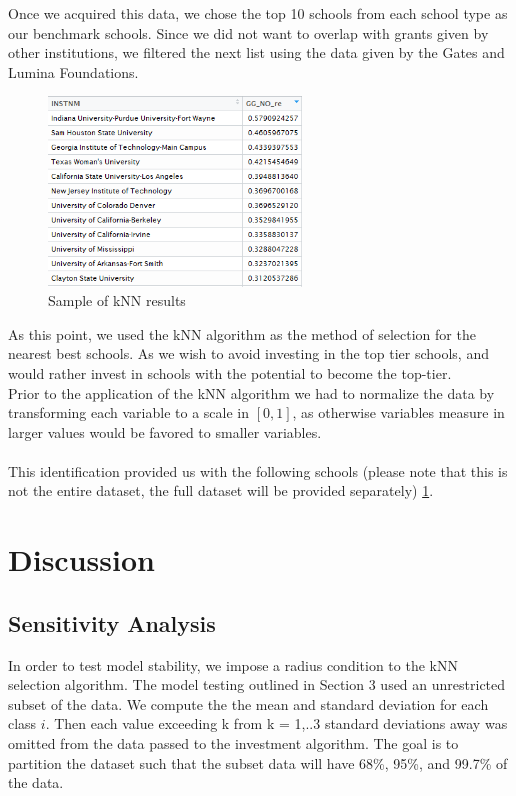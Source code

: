 \documentclass[12pt]{scrartcl}
\begin{document}
	Once we acquired this data, we chose the top 10 schools from each school type as our benchmark schools. Since we did not want to overlap with grants given by other institutions, we filtered the next list using the data given by the Gates\cite{Bill} and Lumina \cite{Grant} Foundations.\\
	\begin{figure}[H]
		\centering
		\includegraphics[width=0.6\textwidth]{6yr-col.png}
		\caption{Sample of kNN results}
		\label{fig:kNN}
	\end{figure}
	
	As this point, we used the kNN algorithm as the method of selection for the nearest best schools. As we wish to avoid investing in the top tier schools, and would rather invest in schools with the potential to become the top-tier.\\ 
	Prior to the application of the kNN algorithm we had to normalize the data by transforming each variable to a scale in $[0,1]$, as otherwise variables measure in larger values would be favored to smaller variables.\\
	\\
	This identification provided us with the following schools (please note that this is not the entire dataset, the full dataset will be provided separately) \ref{fig:kNN}.
	

\section{Discussion} 
\subsection{Sensitivity Analysis}
In order to test model stability, we impose a radius condition to the kNN selection algorithm. The model testing outlined in Section 3 used an unrestricted subset of the data. We compute the the mean and standard deviation for each class $i$. Then each value exceeding k from k = 1,..3 standard deviations away was omitted from the data passed to the investment algorithm. The goal is to partition the dataset such that the subset data will have 68\%, 95\%, and 99.7\% of the data.\\
\end{document}
